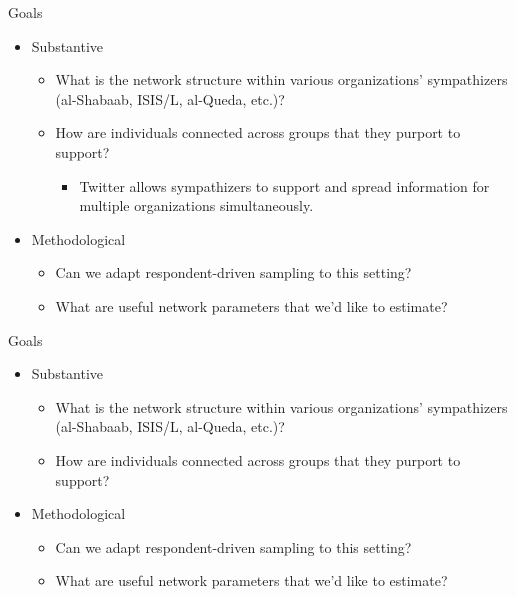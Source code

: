 \documentclass{beamer}
\begin{document}
\begin{frame}{Goals}

\begin{itemize}
\item Substantive
    \begin{itemize}
    \item What is the network structure within various organizations' sympathizers (al-Shabaab, ISIS/L, al-Queda, etc.)?
    \item How are individuals connected across groups that they purport to support?
        \begin{itemize}
        \item Twitter allows sympathizers to support and spread information for multiple organizations simultaneously. 
        \end{itemize}
    \end{itemize}
\item Methodological 
    \begin{itemize}
    \item Can we adapt respondent-driven sampling to this setting?
    \item What are useful network parameters that we’d like to estimate?
    \end{itemize}
\end{itemize}

\end{frame}

\begin{frame}{Goals}
\begin{itemize}
\item Substantive
    \begin{itemize}
    \item \alert{What is the network structure within various organizations' sympathizers (al-Shabaab, ISIS/L, al-Queda, etc.)?}
    \item How are individuals connected across groups that they purport to support?
    \end{itemize}
\item Methodological 
    \begin{itemize}
    \item Can we adapt respondent-driven sampling to this setting?
    \item \alert{What are useful network parameters that we’d like to estimate?}
    \end{itemize}
\end{itemize}
\end{frame}
\end{document}

